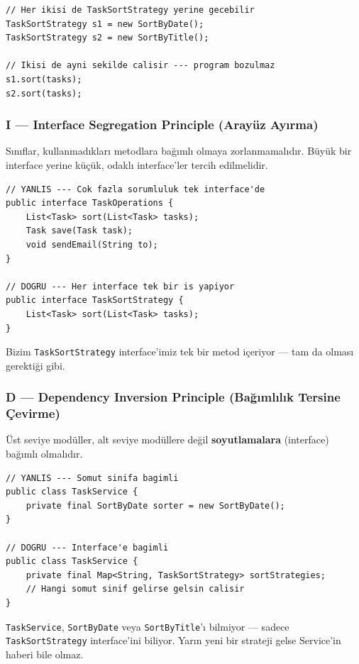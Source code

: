 \documentclass[11pt,a4paper]{article}
\begin{document}
\begin{lstlisting}[style=java]
// Her ikisi de TaskSortStrategy yerine gecebilir
TaskSortStrategy s1 = new SortByDate();
TaskSortStrategy s2 = new SortByTitle();

// Ikisi de ayni sekilde calisir --- program bozulmaz
s1.sort(tasks);
s2.sort(tasks);
\end{lstlisting}

\subsubsection*{I --- Interface Segregation Principle (Aray\"{u}z Ay{\i}rma)}

S{\i}n{\i}flar, kullanmad{\i}klar{\i} metodlara ba\u{g}{\i}ml{\i} olmaya zorlanmamal{\i}d{\i}r. B\"{u}y\"{u}k bir interface yerine k\"{u}\c{c}\"{u}k, odakl{\i} interface'ler tercih edilmelidir.

\begin{lstlisting}[style=java]
// YANLIS --- Cok fazla sorumluluk tek interface'de
public interface TaskOperations {
    List<Task> sort(List<Task> tasks);
    Task save(Task task);
    void sendEmail(String to);
}

// DOGRU --- Her interface tek bir is yapiyor
public interface TaskSortStrategy {
    List<Task> sort(List<Task> tasks);
}
\end{lstlisting}

Bizim \texttt{TaskSortStrategy} interface'imiz tek bir metod i\c{c}eriyor --- tam da olmas{\i} gerekti\u{g}i gibi.

\subsubsection*{D --- Dependency Inversion Principle (Ba\u{g}{\i}ml{\i}l{\i}k Tersine \c{C}evirme)}

\"{U}st seviye mod\"{u}ller, alt seviye mod\"{u}llere de\u{g}il \textbf{soyutlamalara} (interface) ba\u{g}{\i}ml{\i} olmal{\i}d{\i}r.

\begin{lstlisting}[style=java]
// YANLIS --- Somut sinifa bagimli
public class TaskService {
    private final SortByDate sorter = new SortByDate();
}

// DOGRU --- Interface'e bagimli
public class TaskService {
    private final Map<String, TaskSortStrategy> sortStrategies;
    // Hangi somut sinif gelirse gelsin calisir
}
\end{lstlisting}

\texttt{TaskService}, \texttt{SortByDate} veya \texttt{SortByTitle}'{\i} bilmiyor --- sadece \texttt{TaskSortStrategy} interface'ini biliyor. Yar{\i}n yeni bir strateji gelse Service'in haberi bile olmaz.
\end{document}
